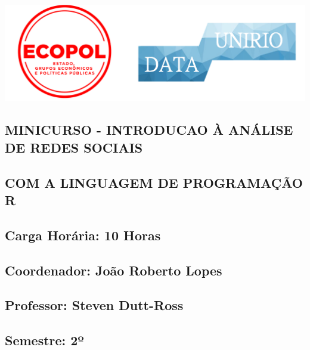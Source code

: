 \documentclass[
]{article}
\author{}
\date{\vspace{-2.5em}}
\def\fullboxbegin{
\bigskip
\begin{tcolorbox}[colback=color1,colframe=color1,coltext=white,arc=0mm,boxrule=0pt]
}
\def\fullboxend{\end{tcolorbox}\medskip}
\begin{document}
\begin{center}\includegraphics[width=0.5\linewidth]{logos} \end{center}

\fullboxbegin

\hypertarget{minicurso---introducao-uxe0-anuxe1lise-de-redes-sociais}{%
\subsection{\texorpdfstring{\textbf{MINICURSO - INTRODUCAO À ANÁLISE DE
REDES
SOCIAIS}}{MINICURSO - INTRODUCAO À ANÁLISE DE REDES SOCIAIS}}\label{minicurso---introducao-uxe0-anuxe1lise-de-redes-sociais}}

\hypertarget{com-a-linguagem-de-programauxe7uxe3o-r}{%
\subsection{\texorpdfstring{\textbf{COM A LINGUAGEM DE PROGRAMAÇÃO
R}}{COM A LINGUAGEM DE PROGRAMAÇÃO R}}\label{com-a-linguagem-de-programauxe7uxe3o-r}}

\fullboxend

\hypertarget{carga-horuxe1ria-10-horas}{%
\subsection{Carga Horária: 10 Horas}\label{carga-horuxe1ria-10-horas}}

\hypertarget{coordenador-jouxe3o-roberto-lopes}{%
\subsection{Coordenador: João Roberto
Lopes}\label{coordenador-jouxe3o-roberto-lopes}}

\hypertarget{professor-steven-dutt-ross}{%
\subsection{Professor: Steven
Dutt-Ross}\label{professor-steven-dutt-ross}}

\hypertarget{semestre-2uxba}{%
\subsection{Semestre: 2º}\label{semestre-2uxba}}
\end{document}
